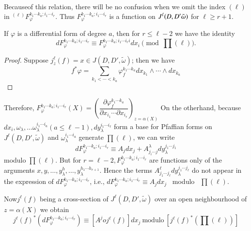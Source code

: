 Because\pageoriginale of this relation, there will be no confusion
when we omit the 
index $(\ell)$ in ${}^{(\ell)} F^{k_ 1\cdots k_a ; i_1 \cdots i_r
}_{\varphi}$. Thus $F^{k_ 1\cdots k_a ; i_1 \cdots i_r }_{\varphi}$ is
a function on $J^\ell\break (D, D' \tilde{\omega})$ for $\ell \geq r+1$. 

\begin{proposition}\label{chap3:sec3.3:prop3}%
  If $\varphi$ is a differential form of degree $a$, then for $r \leq
  \ell - 2$ we have the identity 
  $$
  dF^{k_ 1\cdots k_a ; i_1 \cdots i_r }_{\varphi} \equiv F^{k_ 1\cdots
    k_a ; i_1 \cdots i_r i}_{\varphi} dx_i \pmod{\prod (\ell)}. 
  $$
\end{proposition}

\begin{proof}
  Suppose $j^\ell_z (f) = x \in J (D, D', \tilde{\omega})$; then we have 
  $$
  f^*\varphi = \sum_{k_1 < \cdots < k_a} \varphi_f^{k_1 \cdots k_a}
  dx_{k_1} \wedge \cdots \wedge dx_{k_a} 
  $$
\end{proof}

Therefore, $F^{k_ 1\cdots k_a ; i_1 \cdots i_r }_{\varphi} (X) = \left(
\dfrac{\partial \varphi^{k_1 \cdots k_a}_f}{\partial x_{i_1} \cdots
  \partial x_{i_r}}\right)_{z = \alpha(X)}$ On the otherhand, because
$dx_i, \omega_{\lambda}, \ldots \omega^{i_1 \cdots i_a}_{\lambda} (a
\leq \ell - 1), dy_\lambda^{i_1 \cdots i_\ell}$ form a base for Pfaffian forms on
$J^\ell (D, D', \tilde{\omega})$ and $\omega^{i_1 \cdots i_a}_{\lambda}$
generate $\prod (\ell)$, we can write 
$$
dF^{k_ 1\cdots k_a ; i_1 \cdots
  i_r }_{\varphi}\equiv A_j dx_j + A^{\lambda}_{j_i \cdots j} dy^{j_1
  \cdots j_1}_\lambda
$$ 
modulo $\prod (\ell)$. But for $r = \ell - 2,
F^{k_ 1\cdots k_a ; i_1 \cdots i_r }_{\varphi}$ are functions only of
the arguments $x, y, \ldots ,y^{h}_{\lambda}, \ldots , y^{h_1 \cdots
  h_{r + 1}}_{\lambda}$. Hence the terms $A^\ell_{j_1 \cdots j_\ell}
dy^{j_1 \cdots j_\ell}_{\lambda}$ do not appear in the expression of
$dF^{k_ 1\cdots k_a ; i_1 \cdots i_r }_{\varphi}$, i.e., $dF^{k_
  1\cdots k_a ; i_1 \cdots i_r }_{\varphi} \equiv A_j dx_j $ ~modulo~
$\prod(\ell)$. 

Now\pageoriginale $j^{\ell}(f)$ being a cross-section of $J^\ell (D, D' ,
\tilde{\omega})$ over an open neighbourhood  of $z = \alpha (X)$ we
obtain 
$$
j^{\ell} (f)^* \left(dF^{k_ 1\cdots k_a ; i_1 \cdots i_r }_{\varphi}\right)
\equiv \left[A^j o j^\ell (f)\right] dx_j ~\text{modulo}~ [j^{\ell}(f)^*
  \left(\prod(\ell)\right)] 
$$ 

